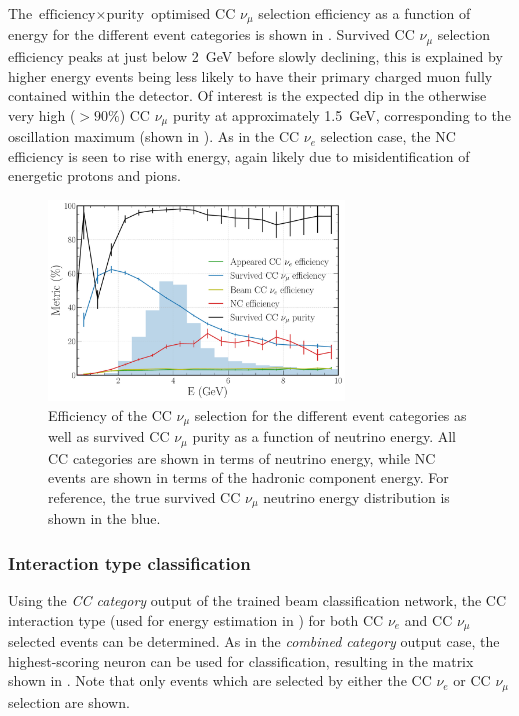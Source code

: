 The $\text{efficiency}\times\text{purity}$ optimised CC $\nu_{\mu}$ selection efficiency as a
function of energy for the different event categories is shown in
. Survived CC $\nu_{\mu}$ selection efficiency peaks at just below
\SI{2}{\GeV} before slowly declining, this is explained by higher energy events being less likely
to have their primary charged muon fully contained within the detector. Of interest is the
expected dip in the otherwise very high ($>90\%$) CC $\nu_{\mu}$ purity at approximately
\SI{1.5}{\GeV}, corresponding to the oscillation maximum (shown in ).
As in the CC $\nu_{e}$ selection case, the NC efficiency is seen to rise with energy, again likely
due to misidentification of energetic protons and pions.

\begin{figure} %
    \includegraphics[width=0.7\textwidth]{diagrams/7-results/final_numu_hists.pdf}
    \caption[Efficiency of the CC $\nu_{\mu}$ selection as a function of energy]
    {Efficiency of the CC $\nu_{\mu}$ selection for the different event categories as well as
        survived CC $\nu_{\mu}$ purity as a function of neutrino energy. All CC categories are
        shown in terms of neutrino energy, while NC events are shown in terms of the hadronic
        component energy. For reference, the true survived CC $\nu_{\mu}$ neutrino energy
        distribution is shown in the blue.}
    \label{fig:final_numu_hists}
\end{figure}

\subsubsection*{Interaction type classification} %

Using the \emph{CC category} output of the trained beam classification network, the CC interaction
type (used for energy estimation in ) for both CC $\nu_{e}$
and CC $\nu_{\mu}$ selected events can be determined. As in the \emph{combined category} output
case, the highest-scoring neuron can be used for classification, resulting in the matrix shown in
. Note that only events which are selected by either the CC
$\nu_{e}$ or CC $\nu_{\mu}$ selection are shown.

